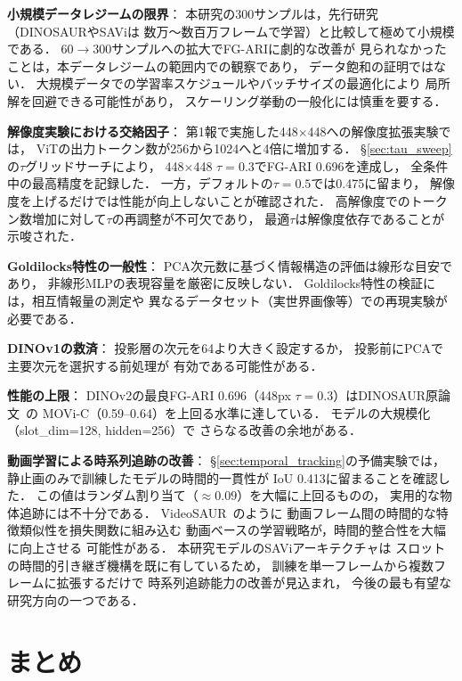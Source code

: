 \documentclass[dvipdfmx,twocolumn]{jarticle}
\begin{document}
\textbf{小規模データレジームの限界}：
本研究の300サンプルは，先行研究（DINOSAURやSAViは
数万〜数百万フレームで学習）と比較して極めて小規模である．
60$\to$300サンプルへの拡大でFG-ARIに劇的な改善が
見られなかったことは，本データレジームの範囲内での観察であり，
データ飽和の証明ではない．
大規模データでの学習率スケジュールやバッチサイズの最適化により
局所解を回避できる可能性があり，
スケーリング挙動の一般化には慎重を要する．

\textbf{解像度実験における交絡因子}：
第1報で実施した448$\times$448への解像度拡張実験では，
ViTの出力トークン数が256から1024へと4倍に増加する．
§\ref{sec:tau_sweep}の$\tau$グリッドサーチにより，
448$\times$448 $\tau{=}0.3$でFG-ARI 0.696を達成し，
全条件中の最高精度を記録した．
一方，デフォルトの$\tau{=}0.5$では0.475に留まり，
解像度を上げるだけでは性能が向上しないことが確認された．
高解像度でのトークン数増加に対して$\tau$の再調整が不可欠であり，
最適$\tau$は解像度依存であることが示唆された．

\textbf{Goldilocks特性の一般性}：
PCA次元数に基づく情報構造の評価は線形な目安であり，
非線形MLPの表現容量を厳密に反映しない．
Goldilocks特性の検証には，相互情報量の測定や
異なるデータセット（実世界画像等）での再現実験が必要である．

\textbf{DINOv1の救済}：
投影層の次元を64より大きく設定するか，
投影前にPCAで主要次元を選択する前処理が
有効である可能性がある．

\textbf{性能の上限}：
DINOv2の最良FG-ARI 0.696（448px $\tau{=}0.3$）はDINOSAUR原論文~\cite{seitzer2023}の
MOVi-C（0.59--0.64）を上回る水準に達している．
モデルの大規模化（slot\_dim=128, hidden=256）で
さらなる改善の余地がある．

\textbf{動画学習による時系列追跡の改善}：
§\ref{sec:temporal_tracking}の予備実験では，
静止画のみで訓練したモデルの時間的一貫性が
IoU 0.413に留まることを確認した．
この値はランダム割り当て（${\approx}0.09$）を大幅に上回るものの，
実用的な物体追跡には不十分である．
VideoSAUR~\cite{zadaianchuk2023}のように
動画フレーム間の時間的な特徴類似性を損失関数に組み込む
動画ベースの学習戦略が，時間的整合性を大幅に向上させる
可能性がある．
本研究モデルのSAViアーキテクチャは
スロットの時間的引き継ぎ機構を既に有しているため，
訓練を単一フレームから複数フレームに拡張するだけで
時系列追跡能力の改善が見込まれ，
今後の最も有望な研究方向の一つである．

\section{まとめ}
\end{document}
